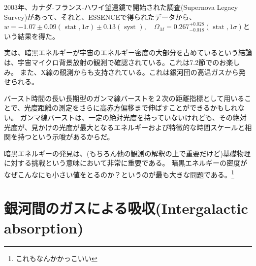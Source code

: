\documentclass[11pt]{ltjsarticle}
\theoremstyle{plain}
\theoremstyle{break}
\begin{document}
2003年、カナダ-フランス-ハワイ望遠鏡で開始された調査(Supernova Legacy Survey)があって、それと、ESSENCEで得られたデータから、$w=-1.07 \pm 0.09(\text { stat }, 1 \sigma) \pm 0.13(\text { syst }), \quad \Omega_{M}=0.267_{-0.018}^{+0.028}(\text { stat }, 1 \sigma)$という結果を得た。

実は、暗黒エネルギーが宇宙のエネルギー密度の大部分を占めているという結論は、宇宙マイクロ背景放射の観測で確認されている。これは7.2節でのお楽しみ。
また、X線の観測からも支持されている。これは銀河団の高温ガスから発せられる。

バースト時間の長い長期型のガンマ線バーストを２次の距離指標として用いることで、光度距離の測定をさらに高赤方偏移まで伸ばすことができるかもしれない。
ガンマ線バーストは、一定の絶対光度を持っていないけれども、その絶対光度が、見かけの光度が最大となるエネルギーおよび特徴的な時間スケールと相関を持つという示唆があるからだ。

暗黒エネルギーの発見は、(もちろん他の観測の解釈の上で重要だけど)基礎物理に対する挑戦という意味において非常に重要である。
暗黒エネルギーの密度がなぜこんなにも小さい値をとるのか？というのが最も大きな問題である。\footnote{これもなんかかっこいい}

\newpage
\setcounter{section}{9}
\setcounter{page}{1}
\section{銀河間のガスによる吸収(Intergalactic absorption)}\label{sec1-10:Intergalactic-absorption}
\end{document}
